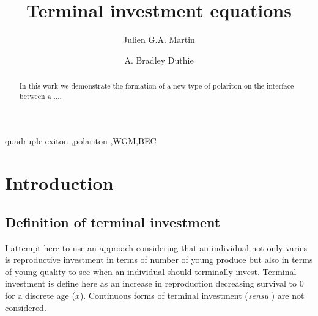 \documentclass[12pt,review,authoryear]{elsarticle}
\begin{document}
\begin{frontmatter}
	\title{Terminal investment equations}

	\author{Julien G.A. Martin}

	\author{A. Bradley Duthie\corref{}}

	
	\address{Institute of Biological and Environmental Sciences\\
	 	University of Aberdeen, Zoology Building, Tillydrone Avenue\\
	 	Aberdeen, AB24 2TZ, Scotland, UK}

	\begin{abstract}
		In this work we demonstrate the formation of a new type of
		polariton on the interface between a ....
	\end{abstract}

	\begin{keyword}
		quadruple exiton \sep polariton \sep WGM\sep BEC
	\end{keyword}

\end{frontmatter}



\section{Introduction}
\subsection{Definition of terminal investment}
I attempt here to use an approach considering that an individual not only  varies is reproductive investment in terms of number of young produce but also in terms of young quality to see when an individual should terminally invest. Terminal investment is define here as an increase in reproduction decreasing survival to 0 for a discrete age ($x$). Continuous forms of terminal investment (\textit{sensu} \citealt{Pianka_Agespecific_1975}) are not considered.
\end{document}

